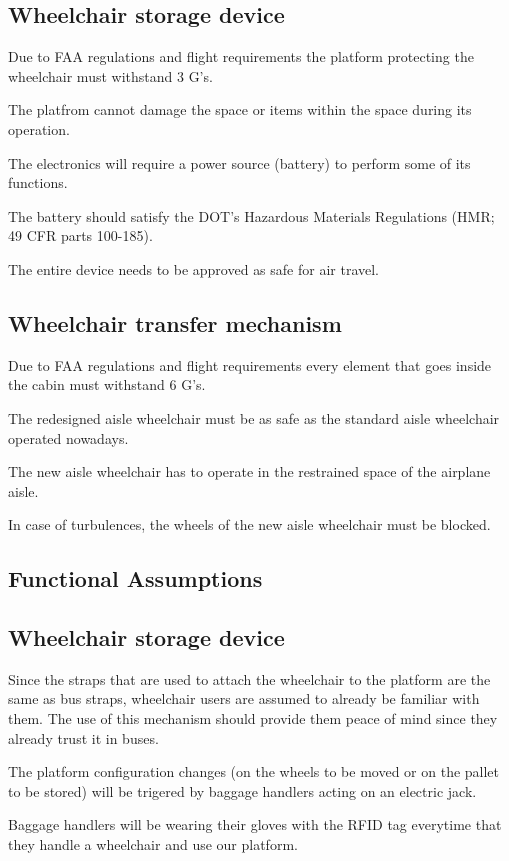 \subsection*{Wheelchair storage device}

\begin{list}{-}{}
  \item Due to FAA regulations and flight requirements the platform protecting the wheelchair must withstand 3 G's.
  \item The platfrom cannot damage the space or items within the space during its operation.
  \item The electronics will require a power source (battery) to perform some of its functions.
  \item The battery should satisfy the DOT’s Hazardous Materials Regulations (HMR; 49 CFR parts 100-185).
  \item The entire device needs to be approved as safe for air travel.
\end{list}

\subsection*{Wheelchair transfer mechanism}

\begin{list}{-}{}
  \item Due to FAA regulations and flight requirements every element that goes inside the cabin must withstand 6 G's.
  \item The redesigned aisle wheelchair must be as safe as the standard aisle wheelchair operated nowadays.
  \item The new aisle wheelchair has to operate in the restrained space of the airplane aisle.
  \item In case of turbulences, the wheels of the new aisle wheelchair must be blocked.
\end{list}

\subsection{Functional Assumptions}

\subsection*{Wheelchair storage device}

\begin{list}{-}{}
  \item Since the straps that are used to attach the wheelchair to the platform are the same as bus straps, wheelchair users are assumed to already be familiar with them. The use of this mechanism should provide them peace of mind since they already trust it in buses.
  \item The platform configuration changes (on the wheels to be moved or on the pallet to be stored) will be trigered by baggage handlers acting on an electric jack.
  \item Baggage handlers will be wearing their gloves with the RFID tag everytime that they handle a wheelchair and use our platform.
\end{list}

